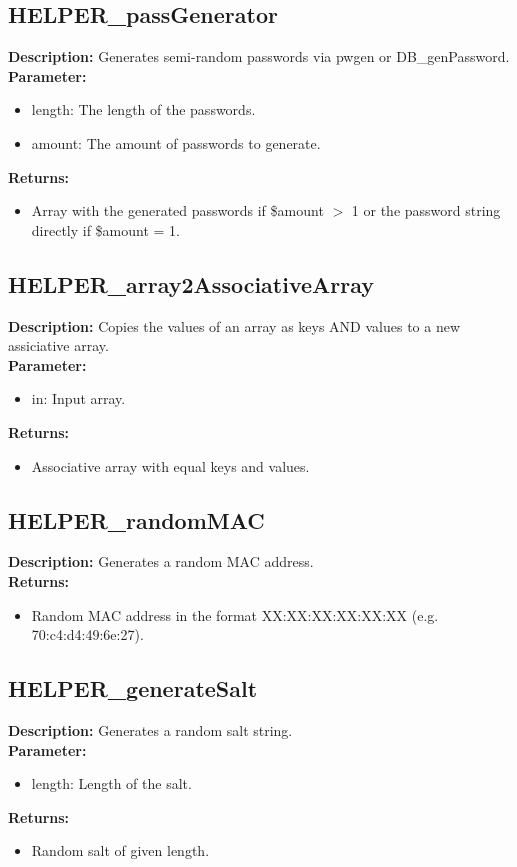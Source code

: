 \subsection{HELPER\_passGenerator}
\textbf{Description:} Generates semi-random passwords via pwgen or DB\_genPassword.\\
\textbf{Parameter:}
\begin{itemize}
\item length: The length of the passwords.
\item amount: The amount of passwords to generate.
\end{itemize}
\textbf{Returns:}
\begin{itemize}
\item Array with the generated passwords if \$amount $>$ 1 or the password string directly if \$amount = 1.
\end{itemize}

\subsection{HELPER\_array2AssociativeArray}
\textbf{Description:} Copies the values of an array as keys AND values to a new assiciative array.\\
\textbf{Parameter:}
\begin{itemize}
\item in: Input array.
\end{itemize}
\textbf{Returns:}
\begin{itemize}
\item Associative array with equal keys and values.
\end{itemize}

\subsection{HELPER\_randomMAC}
\textbf{Description:} Generates a random MAC address.\\
\textbf{Returns:}
\begin{itemize}
\item Random MAC address in the format XX:XX:XX:XX:XX:XX (e.g. 70:c4:d4:49:6e:27).
\end{itemize}

\subsection{HELPER\_generateSalt}
\textbf{Description:} Generates a random salt string.\\
\textbf{Parameter:}
\begin{itemize}
\item length: Length of the salt.
\end{itemize}
\textbf{Returns:}
\begin{itemize}
\item Random salt of given length.
\end{itemize}

